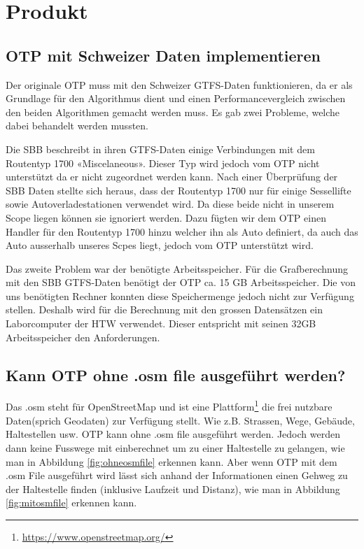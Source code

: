 \section{Produkt}

\subsection{OTP mit Schweizer Daten implementieren}
Der originale OTP muss mit den Schweizer GTFS-Daten funktionieren, da er als Grundlage für den Algorithmus dient und einen Performancevergleich zwischen den beiden Algorithmen gemacht werden muss. Es gab zwei Probleme, welche dabei behandelt werden mussten.
\newline


Die SBB beschreibt in ihren GTFS-Daten einige Verbindungen mit dem Routentyp 1700 «Miscelaneous». Dieser Typ wird jedoch vom OTP nicht unterstützt da er nicht zugeordnet werden kann. Nach einer Überprüfung der SBB Daten stellte sich heraus, dass der Routentyp 1700 nur für einige Sessellifte sowie Autoverladestationen verwendet wird. Da diese beide nicht in unserem Scope liegen können sie ignoriert werden. Dazu fügten wir dem OTP einen Handler für den Routentyp 1700 hinzu welcher ihn als Auto definiert, da auch das Auto ausserhalb unseres Scpes liegt, jedoch vom OTP unterstützt wird.
\newline


Das zweite Problem war der benötigte Arbeitsspeicher. Für die Grafberechnung mit den SBB GTFS-Daten benötigt der OTP ca. 15 GB Arbeitsspeicher. Die von uns benötigten Rechner konnten diese Speichermenge jedoch nicht zur Verfügung stellen. Deshalb wird für die Berechnung mit den grossen Datensätzen ein Laborcomputer der HTW verwendet. Dieser entspricht mit seinen 32GB Arbeitsspeicher den Anforderungen.


\subsection{Kann OTP ohne .osm file ausgeführt werden?}
Das .osm steht für OpenStreetMap und ist eine Plattform\footnote{\url{https://www.openstreetmap.org/}} die frei nutzbare Daten(sprich Geodaten) zur Verfügung stellt. Wie z.B. Strassen, Wege, Gebäude, Haltestellen usw. OTP kann ohne .osm file ausgeführt werden. Jedoch werden dann keine Fusswege mit einberechnet um zu einer Haltestelle zu gelangen, wie man in Abbildung \ref{fig:ohneosmfile} erkennen kann.
Aber wenn OTP mit dem .osm File ausgeführt wird lässt sich anhand der Informationen einen Gehweg zu der Haltestelle finden (inklusive Laufzeit und Distanz), wie man in Abbildung \ref{fig:mitosmfile} erkennen kann. 


